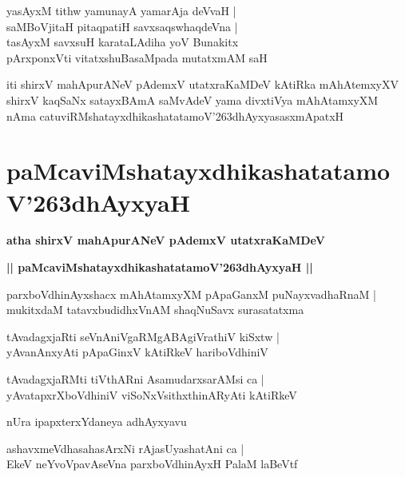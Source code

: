 \documentclass[twoside,12pt,openright]{book}
\def\S{\char'263}
\newcounter{shloka}[chapter]
\begin{document}
\begin{shloka}%
yasAyxM tithw yamunayA yamarAja deVvaH |\\
saMBoVjitaH pitaqpatiH savxsaqswhaqdeVna |\\
tasAyxM savxsuH karataLAdiha yoV Bunakitx \\
pArxponxVti vitatxshuBasaMpada mutatxmAM saH 
\end{shloka}

\begin{center}
iti shirxV mahApurANeV pAdemxV utatxraKaMDeV kAtiRka mAhAtemxyXV shirxV kaqSaNx satayxBAmA 
saMvAdeV yama divxtiVya mAhAtamxyXM nAma catuviRMshatayxdhikashatatamoV\S dhAyxyasasxmApatxH 
\end{center}

\chapter{paMcaviMshatayxdhikashatatamoV\S dhAyxyaH}

\begin{center}
{\LARGE\bfseries atha shirxV mahApurANeV pAdemxV utatxraKaMDeV}
\end{center}

\begin{center}
{\LARGE\bfseries || paMcaviMshatayxdhikashatatamoV\S dhAyxyaH || }
\end{center}

\begin{shloka}%
parxboVdhinAyxshacx mAhAtamxyXM pApaGanxM puNayxvadhaRnaM |\\
mukitxdaM tatavxbudidhxVnAM shaqNuSavx surasatatxma 
\end{shloka}

\begin{shloka}%
tAvadagxjaRti seVnAniVgaRMgABAgiVrathiV kiSxtw |\\
yAvanAnxyAti pApaGinxV kAtiRkeV hariboVdhiniV
\end{shloka}

\begin{shloka}%
tAvadagxjaRMti tiVthARni AsamudarxsarAMsi ca |\\
yAvatapxrXboVdhiniV viSoNxVsithxthinARyAti kAtiRkeV 
\end{shloka}

\begin{center}
nUra ipapxterxYdaneya adhAyxyavu
\end{center}

\begin{shloka}%
ashavxmeVdhasahasArxNi rAjasUyashatAni ca |\\
EkeV neYvoVpavAseVna parxboVdhinAyxH PalaM laBeVtf 
\end{shloka}
\end{document}
